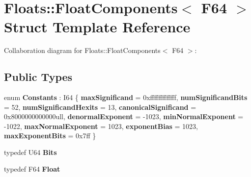 \hypertarget{struct_floats_1_1_float_components_3_01_f64_01_4}{}\section{Floats\+:\+:Float\+Components$<$ F64 $>$ Struct Template Reference}
\label{struct_floats_1_1_float_components_3_01_f64_01_4}


Collaboration diagram for Floats\+:\+:Float\+Components$<$ F64 $>$\+:
\subsection*{Public Types}
\begin{DoxyCompactItemize}
\item 
\mbox{\label{struct_floats_1_1_float_components_3_01_f64_01_4_a1a2a3664f12cd37c562970cd25184ff0}} 
enum {\bfseries Constants} \+: I64 \{ \newline
{\bfseries max\+Significand} = 0xfffffffffffff, 
{\bfseries num\+Significand\+Bits} = 52, 
{\bfseries num\+Significand\+Hexits} = 13, 
{\bfseries canonical\+Significand} = 0x8000000000000ull, 
\newline
{\bfseries denormal\+Exponent} = -\/1023, 
{\bfseries min\+Normal\+Exponent} = -\/1022, 
{\bfseries max\+Normal\+Exponent} = 1023, 
{\bfseries exponent\+Bias} = 1023, 
\newline
{\bfseries max\+Exponent\+Bits} = 0x7ff
 \}
\item 
\mbox{\label{struct_floats_1_1_float_components_3_01_f64_01_4_a314ef829ce73cfe8558c69a58545635f}} 
typedef U64 {\bfseries Bits}
\item 
\mbox{\label{struct_floats_1_1_float_components_3_01_f64_01_4_a402bedbc4f69d6bf267281a521408288}} 
typedef F64 {\bfseries Float}
\end{DoxyCompactItemize}
